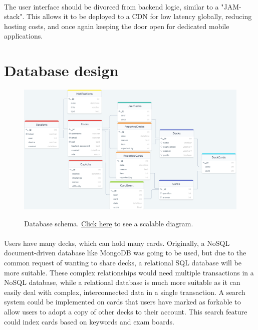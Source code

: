 \documentclass{report}
\begin{document}
\paragraph{}
The user interface should be divorced from backend logic, similar to a "JAM-stack". This allows it to be deployed to a CDN for low latency globally, reducing hosting costs, and once again keeping the door open for dedicated mobile applications.

\section{Database design}

\begin{figure}[h!]
  \includegraphics[width=\linewidth]{./media/db_schema.png}
  \label{fig:database1}
  \caption{Database schema. \href{https://drawsql.app/--347/diagrams/iroase}{Click here} to see a scalable diagram.}
\end{figure}

\paragraph{}
Users have many decks, which can hold many cards. Originally, a NoSQL document-driven database like MongoDB was going to be used, but due to the common request of wanting to share decks, a relational SQL database will be more suitable. These complex relationships would need multiple transactions in a NoSQL database, while a relational database is much more suitable as it can easily deal with complex, interconnected data in a single transaction. A search system could be implemented on cards that users have marked as forkable to allow users to adopt a copy of other decks to their account. This search feature could index cards based on keywords and exam boards.
\end{document}
